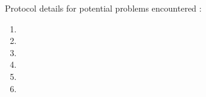 \documentclass[10pt,letter,english]{article}
\begin{document}
\noindent Protocol details for potential problems  encountered :
\begin{enumerate}
    \item %
    \item%
    \item%
    \item%
    \item%
    \item %
\end{enumerate}












\end{document}
